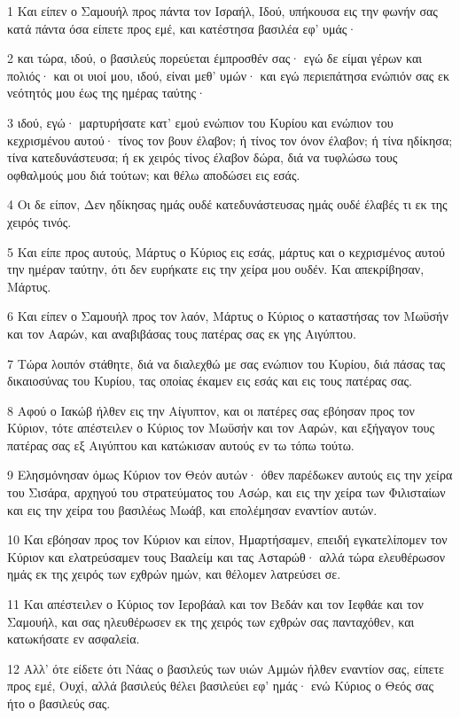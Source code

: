 \par 1 Και είπεν ο Σαμουήλ προς πάντα τον Ισραήλ, Ιδού, υπήκουσα εις την φωνήν σας κατά πάντα όσα είπετε προς εμέ, και κατέστησα βασιλέα εφ' υμάς·
\par 2 και τώρα, ιδού, ο βασιλεύς πορεύεται έμπροσθέν σας· εγώ δε είμαι γέρων και πολιός· και οι υιοί μου, ιδού, είναι μεθ' υμών· και εγώ περιεπάτησα ενώπιόν σας εκ νεότητός μου έως της ημέρας ταύτης·
\par 3 ιδού, εγώ· μαρτυρήσατε κατ' εμού ενώπιον του Κυρίου και ενώπιον του κεχρισμένου αυτού· τίνος τον βουν έλαβον; ή τίνος τον όνον έλαβον; ή τίνα ηδίκησα; τίνα κατεδυνάστευσα; ή εκ χειρός τίνος έλαβον δώρα, διά να τυφλώσω τους οφθαλμούς μου διά τούτων; και θέλω αποδώσει εις εσάς.
\par 4 Οι δε είπον, Δεν ηδίκησας ημάς ουδέ κατεδυνάστευσας ημάς ουδέ έλαβές τι εκ της χειρός τινός.
\par 5 Και είπε προς αυτούς, Μάρτυς ο Κύριος εις εσάς, μάρτυς και ο κεχρισμένος αυτού την ημέραν ταύτην, ότι δεν ευρήκατε εις την χείρα μου ουδέν. Και απεκρίβησαν, Μάρτυς.
\par 6 Και είπεν ο Σαμουήλ προς τον λαόν, Μάρτυς ο Κύριος ο καταστήσας τον Μωϋσήν και τον Ααρών, και αναβιβάσας τους πατέρας σας εκ γης Αιγύπτου.
\par 7 Τώρα λοιπόν στάθητε, διά να διαλεχθώ με σας ενώπιον του Κυρίου, διά πάσας τας δικαιοσύνας του Κυρίου, τας οποίας έκαμεν εις εσάς και εις τους πατέρας σας.
\par 8 Αφού ο Ιακώβ ήλθεν εις την Αίγυπτον, και οι πατέρες σας εβόησαν προς τον Κύριον, τότε απέστειλεν ο Κύριος τον Μωϋσήν και τον Ααρών, και εξήγαγον τους πατέρας σας εξ Αιγύπτου και κατώκισαν αυτούς εν τω τόπω τούτω.
\par 9 Ελησμόνησαν όμως Κύριον τον Θεόν αυτών· όθεν παρέδωκεν αυτούς εις την χείρα του Σισάρα, αρχηγού του στρατεύματος του Ασώρ, και εις την χείρα των Φιλισταίων και εις την χείρα του βασιλέως Μωάβ, και επολέμησαν εναντίον αυτών.
\par 10 Και εβόησαν προς τον Κύριον και είπον, Ημαρτήσαμεν, επειδή εγκατελίπομεν τον Κύριον και ελατρεύσαμεν τους Βααλείμ και τας Ασταρώθ· αλλά τώρα ελευθέρωσον ημάς εκ της χειρός των εχθρών ημών, και θέλομεν λατρεύσει σε.
\par 11 Και απέστειλεν ο Κύριος τον Ιεροβάαλ και τον Βεδάν και τον Ιεφθάε και τον Σαμουήλ, και σας ηλευθέρωσεν εκ της χειρός των εχθρών σας πανταχόθεν, και κατωκήσατε εν ασφαλεία.
\par 12 Αλλ' ότε είδετε ότι Νάας ο βασιλεύς των υιών Αμμών ήλθεν εναντίον σας, είπετε προς εμέ, Ουχί, αλλά βασιλεύς θέλει βασιλεύει εφ' ημάς· ενώ Κύριος ο Θεός σας ήτο ο βασιλεύς σας.
